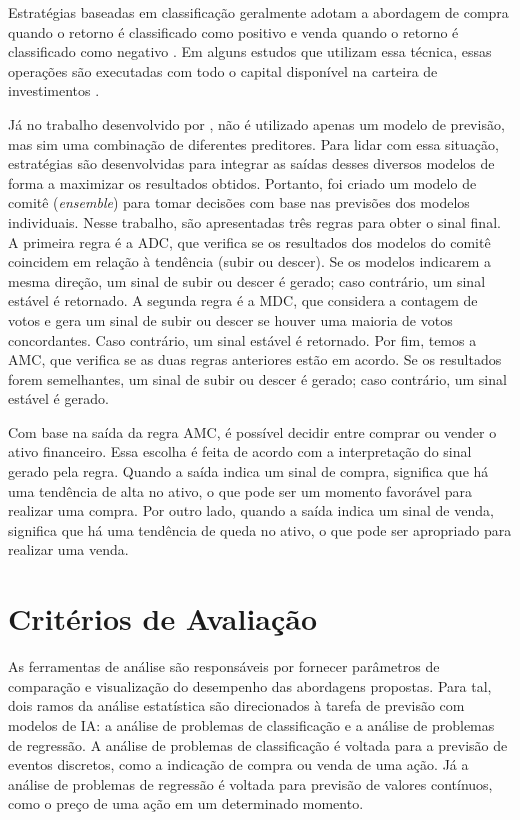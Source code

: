 Estratégias baseadas em classificação geralmente adotam a abordagem de compra quando o retorno é classificado como positivo e venda quando o retorno é classificado como negativo \cite{Chaojie_Stock}. Em alguns estudos que utilizam essa técnica, essas operações são executadas com todo o capital disponível na carteira de investimentos \cite{Jerzy_Deep, Charlene, C_Veeramani_Exploration}.

Já no trabalho desenvolvido por , não é utilizado apenas um modelo de previsão, mas sim uma combinação de diferentes preditores. Para lidar com essa situação, estratégias são desenvolvidas para integrar as saídas desses diversos modelos de forma a maximizar os resultados obtidos. Portanto, foi criado um modelo de comitê (\textit{ensemble}) para tomar decisões com base nas previsões dos modelos individuais. Nesse trabalho, são apresentadas três regras para obter o sinal final. A primeira regra é a \ac{ADC}, que verifica se os resultados dos modelos do comitê coincidem em relação à tendência (subir ou descer). Se os modelos indicarem a mesma direção, um sinal de subir ou descer é gerado; caso contrário, um sinal estável é retornado. A segunda regra é a \ac{MDC}, que considera a contagem de votos e gera um sinal de subir ou descer se houver uma maioria de votos concordantes. Caso contrário, um sinal estável é retornado. Por fim, temos a \ac{AMC}, que verifica se as duas regras anteriores estão em acordo. Se os resultados forem semelhantes, um sinal de subir ou descer é gerado; caso contrário, um sinal estável é gerado. 

Com base na saída da regra \ac{AMC}, é possível decidir entre comprar ou vender o ativo financeiro. Essa escolha é feita de acordo com a interpretação do sinal gerado pela regra. Quando a saída indica um sinal de compra, significa que há uma tendência de alta no ativo, o que pode ser um momento favorável para realizar uma compra. Por outro lado, quando a saída indica um sinal de venda, significa que há uma tendência de queda no ativo, o que pode ser apropriado para realizar uma venda.


\section{Critérios de Avaliação}
\label{subsec:criterio_avaliacao}
As ferramentas de análise são responsáveis por fornecer parâmetros de comparação e visualização do desempenho das abordagens propostas. Para tal, dois ramos da análise estatística são direcionados à tarefa de previsão com modelos de \ac{IA}: a análise de problemas de classificação e a análise de problemas de regressão. A análise de problemas de classificação é voltada para a previsão de eventos discretos, como a indicação de compra ou venda de uma ação. Já a análise de problemas de regressão é voltada para previsão de valores contínuos, como o preço de uma ação em um determinado momento.

